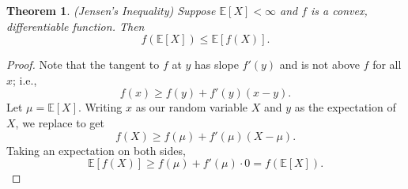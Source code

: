 \documentclass{tufte-handout}
\newcommand*\E{\mathbb{E}}
\newtheorem{thm}{Theorem}[subsection]
\theoremstyle{definition}
\begin{document}
\begin{thm}
	(Jensen's Inequality) Suppose $\E\left[X\right] < \infty$ and $f$ is a convex, differentiable function. Then \[
		f(\E\left[X\right] ) \le \E\left[f(X)\right] 
	.\] 
\end{thm}

\begin{proof}
	Note that the tangent to $f$ at $y$ has slope $f'(y)$ and is not above $f$ for all $x$; i.e., \[
		f(x) \ge f(y) + f'(y)(x-y)
	.\] Let $\mu = \E\left[X\right] $. Writing $x$ as our random variable $X$ and $y$ as the expectation of $X$, we replace to get \[
		f(X) \ge f(\mu) + f'(\mu)(X - \mu)
	.\] Taking an expectation on both sides, \[
		\E\left[f(X)\right] \ge f(\mu) + f'(\mu) \cdot 0 = f(\E\left[X\right] )
	.\] 
\end{proof}
\end{document}
